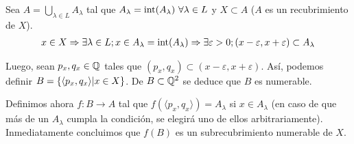 
Sea $A = \bigcup_{\lambda\in L} A_\lambda$ tal que $A_\lambda = \interior (A_\lambda)\ \forall \lambda\in L$ y $X\subset A$ ($A$ es un recubrimiento de $X$).
\begin{align*}
	x\in X
	\Rightarrow \exists \lambda\in L; x\in A_\lambda = \operatorname{int}(A_\lambda)
	\Rightarrow \exists \varepsilon > 0; (x-\varepsilon,x+\varepsilon) \subset A_\lambda
\end{align*}

Luego, sean $p_x,q_x\in\mathbb{Q}$ tales que $(p_x,q_x) \subset (x-\varepsilon,x+\varepsilon)$.
Así, podemos definir $B = \left\{\langle p_x,q_x \rangle | x\in X\right\}$.
De $B\subset \mathbb{Q}^2$ se deduce que $B$ es numerable.

Definimos ahora $f:B\to A$ tal que $f(\langle p_x,q_x \rangle) = A_\lambda$ si $x\in A_\lambda$ (en caso de que más de un $A_\lambda$ cumpla la condición, se elegirá uno de ellos arbitrariamente).
Inmediatamente concluimos que $f(B)$ es un subrecubrimiento numerable de $X$.